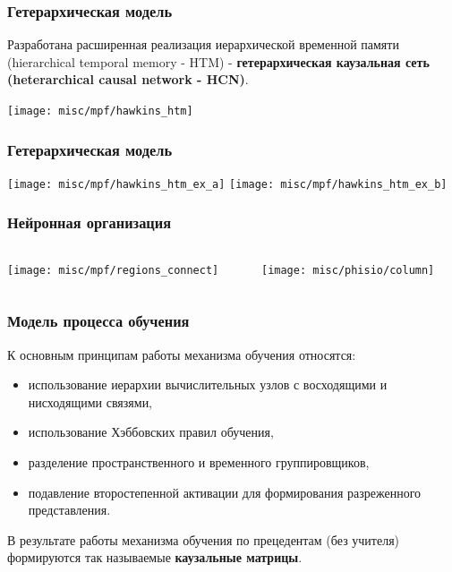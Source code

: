 \documentclass[default]{beamer}
\begin{document}
	
	\begin{frame}
		\frametitle{Гетерархическая модель}
		
		Разработана расширенная реализация иерархической временной памяти (hierarchical temporal memory - HTM) - \textbf{гетерархическая каузальная сеть (heterarchical causal network - HCN)}.
		
		\begin{center}
			\texttt{[image: misc/mpf/hawkins\_htm]}
		\end{center}

	\end{frame}

	\begin{frame}
		\frametitle{Гетерархическая модель}

		\begin{center}
			\texttt{[image: misc/mpf/hawkins\_htm\_ex\_a]}
			\texttt{[image: misc/mpf/hawkins\_htm\_ex\_b]}
		\end{center}
		\nocite{*}
		\printbibliography[keyword={hetermem}, resetnumbers=true]
	\end{frame}
		
	\begin{frame}
		\frametitle{Нейронная организация}
		
		\begin{columns}
			\begin{column}{0.65\textwidth}
				\texttt{[image: misc/mpf/regions\_connect]}
			\end{column}
			\begin{column}{0.35\textwidth}
				\texttt{[image: misc/phisio/column]}
			\end{column}
		\end{columns}
		\nocite{*}
		\printbibliography[keyword={simplehtm}, resetnumbers=true]
	\end{frame}
	
	\begin{frame}
		\frametitle{Модель процесса обучения}
		
		К основным принципам работы механизма обучения относятся: 
		
		\begin{itemize}
			\item использование иерархии вычислительных узлов с восходящими и нисходящими связями, 
			\item использование Хэббовских правил обучения, 
			\item разделение пространственного и временного группировщиков, 
			\item подавление второстепенной активации для формирования разреженного представления.
		\end{itemize}
		
		В результате работы механизма обучения по прецедентам (без учителя) формируются так называемые \textbf{каузальные матрицы}.
		\vfill
		\nocite{*}
		\printbibliography[keyword={htmlearn}, resetnumbers=true]
	\end{frame}	
	
\end{document}
